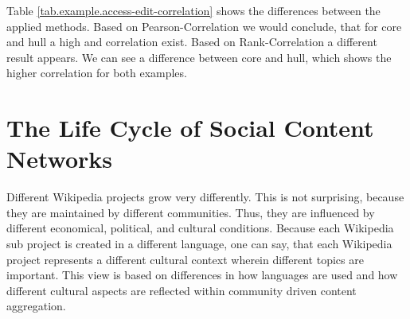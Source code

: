 \documentclass[a4paper,10pt]{scrbook}
\begin{document}
%



%



\label{table.AccessEditCorrelation} 


Table \ref{tab.example.access-edit-correlation} shows the differences between the applied methods. Based on Pearson-Correlation we would conclude, that for core and hull a high and  correlation exist. Based on Rank-Correlation a different result appears. We can see a difference between core and hull, which shows the higher correlation for both examples.


\clearpage
\newpage


 







\chapter{The Life Cycle of Social Content Networks}
Different Wikipedia projects grow very differently. This is not surprising, because they are maintained by different communities. Thus, they are influenced by different economical, political, and cultural conditions. Because each Wikipedia sub project is created in a different language, one can say, that each Wikipedia project represents a different cultural context wherein different topics are important. This view is based on differences in how languages are used and how different cultural aspects are reflected within community driven content aggregation. 
\end{document}
